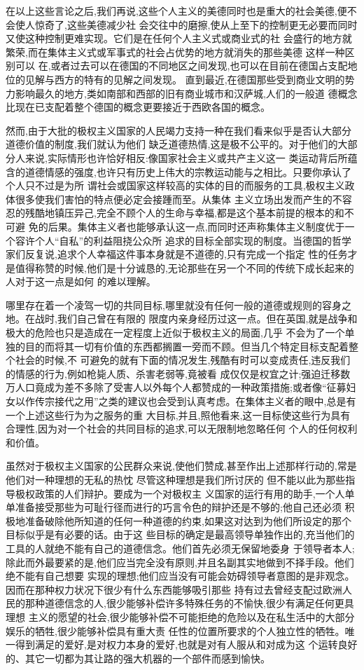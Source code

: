 ﻿\documentclass[12pt]{article}
\begin{document}
在以上这些言论之后,我们再说,这些个人主义的美德同时也是重大的社会美德,便不会使人惊奇了,这些美德减少社
会交往中的磨擦,使从上至下的控制更无必要而同时又使这种控制更难实现。它们是在任何个人主义式或商业式的社
会盛行的地方就繁荣,而在集体主义式或军事式的社会占优势的地方就消失的那些美德 \myrule 这样一种区别可以
在,或者过去可以在德国的不同地区之间发现,也可以在目前在德国占支配地位的见解与西方的特有的见解之间发现。
直到最近,在德国那些受到商业文明的势力影响最久的地方,类如南部和西部的旧有商业城市和汉萨城,人们的一般道
德概念比现在已支配着整个德国的概念更要接近于西欧各国的概念。

然而,由于大批的极权主义国家的人民竭力支持一种在我们看来似乎是否认大部分道德价值的制度,我们就认为他们
缺乏道德热情,这是极不公平的。对于他们的大部分人来说,实际情形也许恰好相反:像国家社会主义或共产主义这一
类运动背后所蕴含的道德情感的强度,也许只有历史上伟大的宗教运动能与之相比。只要你承认了个人只不过是为所
谓社会或国家这样较高的实体的目的而服务的工具,极权主义政体很多使我们害怕的特点便必定会接踵而至。从集体
主义立场出发而产生的不容忍的残酷地镇压异己,完全不顾个人的生命与幸福,都是这个基本前提的根本的和不可避
免的后果。集体主义者也能够承认这一点,而同时还声称集体主义制度优于一个容许个人``自私''的利益阻挠公众所
追求的目标全部实现的制度。当德国的哲学家们反复说,追求个人幸福这件事本身就是不道德的,只有完成一个指定
性的任务才是值得称赞的时候,他们是十分诚恳的,无论那些在另一个不同的传统下成长起来的人对于这一点是如何
的难以理解。

哪里存在着一个凌驾一切的共同目标,哪里就没有任何一般的道德或规则的容身之地。在战时,我们自己曾在有限的
限度内亲身经历过这一点。但在英国,就是战争和极大的危险也只是造成在一定程度上近似于极权主义的局面,几乎
不会为了一个单独的目的而将其一切有价值的东西都搁置一旁而不顾。但当几个特定目标支配着整个社会的时候,不
可避免的就有下面的情况发生,残酷有时可以变成责任,违反我们的情感的行为,例如枪毙人质、杀害老弱等,竟被看
成仅仅是权宜之计;强迫迁移数万人口竟成为差不多除了受害人以外每个人都赞成的一种政策措施;或者像``征募妇
女以作传宗接代之用''之类的建议也会受到认真考虑。在集体主义者的眼中,总是有一个上述这些行为为之服务的重
大目标,并且,照他看来,这一目标使这些行为具有合理性,因为对一个社会的共同目标的追求,可以无限制地忽略任何
个人的任何权利和价值。

虽然对于极权主义国家的公民群众来说,使他们赞成,甚至作出上述那样行动的,常是他们对一种理想的无私的热忱
\myrule 尽管这种理想是我们所讨厌的 \myrule 但不能以此为那些指导极权政策的人们辩护。要成为一个对极权主
义国家的运行有用的助手,一个人单单准备接受那些为可耻行径而进行的巧言令色的辩护还是不够的;他自己还必须
积极地准备破除他所知道的任何一种道德的约束,如果这对达到为他们所设定的那个目标似乎是有必要的话。由于这
些目标的确定是最高领导单独作出的,充当他们的工具的人就绝不能有自己的道德信念。他们首先必须无保留地委身
于领导者本人;除此而外最要紧的是,他们应当完全没有原则,并且名副其实地做到不择手段。他们绝不能有自己想要
实现的理想;他们应当没有可能会妨碍领导者意图的是非观念。因而在那种权力状况下很少有什么东西能够吸引那些
持有过去曾经支配过欧洲人民的那种道德信念的人,很少能够补偿许多特殊任务的不愉快,很少有满足任何更具理想
主义的愿望的社会,很少能够补偿不可能拒绝的危险以及在私生活中的大部分娱乐的牺牲,很少能够补偿具有重大责
任性的位置所要求的个人独立性的牺牲。唯一得到满足的爱好,是对权力本身的爱好,也就是对有人服从和对成为这
个运转良好的、其它一切都为其让路的强大机器的一个部件而感到愉快。
\end{document}
